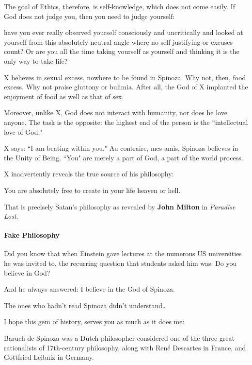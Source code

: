 The goal of Ethics, therefore, is self-knowledge, which does not come easily. If God does not judge you, then you need to judge yourself:

\begin{quotex}
have you ever really observed yourself consciously and uncritically and looked at yourself from this absolutely neutral angle where no self-justifying or excuses count? Or are you all the time taking yourself as yourself and thinking it is the only way to take life? 

\end{quotex}
X believes in sexual excess, nowhere to be found in Spinoza. Why not, then, food excess. Why not praise gluttony or bulimia. After all, the God of X implanted the enjoyment of food as well as that of sex.

Moreover, unlike X, God does not interact with humanity, nor does he love anyone. The task is the opposite: the highest end of the person is the ``intellectual love of God."

X says: ``I am beating within you." Au contraire, mes amis, Spinoza believes in the Unity of Being. ``You" are merely a part of God, a part of the world process.

X inadvertently reveals the true source of his philosophy:

\begin{quotex}
You are absolutely free to create in your life heaven or hell. 

\end{quotex}
That is precisely Satan's philosophy as revealed by \textbf{John Milton} in \emph{Paradise Lost}.

\paragraph{Fake Philosophy}
Did you know that when Einstein gave lectures at the numerous US universities he was invited to, the recurring question that students asked him was: Do you believe in God?

And he always answered: I believe in the God of Spinoza.

The ones who hadn't read Spinoza didn't understand…

I hope this gem of history, serves you as much as it does me:

Baruch de Spinoza was a Dutch philosopher considered one of the three great rationalists of 17th-century philosophy, along with René Descartes in France, and Gottfried Leibniz in Germany.


